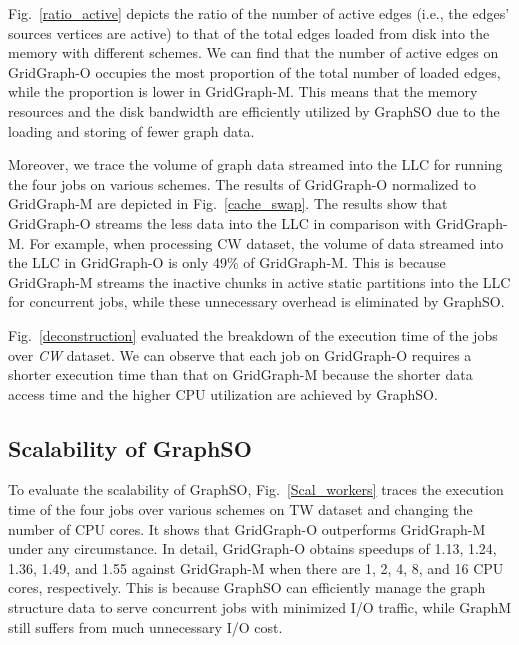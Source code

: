 \documentclass[10pt,journal,compsoc]{IEEEtran}
\begin{document}
Fig.~\ref{ratio_active} depicts the ratio of the number of active edges (i.e., the edges' sources vertices are active) to that of the total edges loaded from disk into the memory with different schemes. We can find that the number of active edges on GridGraph-O occupies the most proportion of the total number of loaded edges, while the proportion is lower in GridGraph-M. This means that the memory resources and the disk bandwidth are efficiently utilized by GraphSO due to the loading and storing of fewer graph data.

Moreover, we trace the volume of graph data streamed into the LLC for running the four jobs on various schemes. The results of GridGraph-O normalized to GridGraph-M are depicted in Fig.~\ref{cache_swap}. The results show  that GridGraph-O streams the less data into the LLC in comparison with GridGraph-M. For example, when processing CW dataset, the volume of data streamed into the LLC in GridGraph-O is only 49\% of GridGraph-M. This is because GridGraph-M streams the inactive chunks in active static partitions into the LLC for concurrent jobs, while these unnecessary overhead is eliminated by GraphSO.

Fig.~\ref{deconstruction} evaluated the breakdown of the execution time of the jobs over \textit{CW} dataset. We can observe that each job on GridGraph-O requires a shorter execution time than that on GridGraph-M because the shorter data access time and the higher CPU utilization are achieved by GraphSO.

\vspace{-10pt}
\subsection{Scalability of GraphSO}
\vspace{-2pt}
To evaluate the scalability of GraphSO, Fig.~\ref{Scal_workers} traces the execution time of the four jobs over various schemes on TW dataset and changing the number of CPU cores. It shows that GridGraph-O outperforms GridGraph-M under any circumstance. In detail, GridGraph-O obtains speedups of 1.13, 1.24, 1.36, 1.49, and 1.55 against GridGraph-M when there are 1, 2, 4, 8, and 16 CPU cores, respectively.
This is because GraphSO can efficiently manage the graph structure data to serve concurrent jobs with minimized I/O traffic, while GraphM still suffers from much unnecessary I/O cost.
\end{document}
